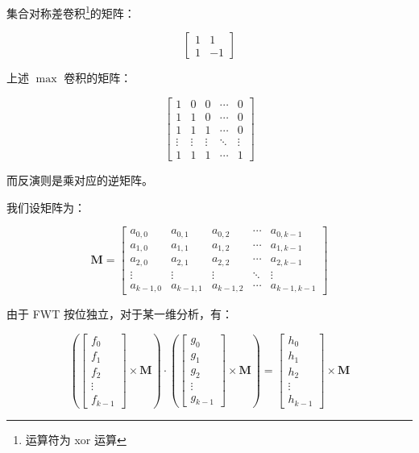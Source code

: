 \documentclass{article}
\begin{document}
集合对称差卷积\footnote{运算符为 xor 运算}的矩阵：

$$\begin{bmatrix} 1 & 1 \\ 1 & -1 \end{bmatrix}$$

上述 $\max$ 卷积的矩阵：

$$\begin{bmatrix} 1& 0 & 0& \cdots & 0\\ 1& 1& 0& \cdots & 0\\ 1& 1 & 1& \cdots & 0\\ \vdots& \vdots& \vdots& \ddots& \vdots\\ 1& 1& 1 & \cdots & 1 \end{bmatrix}$$

而反演则是乘对应的逆矩阵。

我们设矩阵为：

$$\mathbf{M}=\begin{bmatrix} a_{0,0}&  a_{0,1} &  a_{0,2}& \cdots &  a_{0,k-1}\\  a_{1,0}&  a_{1,1}&  a_{1,2}& \cdots &  a_{1,k-1}\\  a_{2,0}&  a_{2,1} &  a_{2,2}& \cdots &  a_{2,k-1}\\ \vdots& \vdots& \vdots& \ddots& \vdots\\  a_{k-1,0}&  a_{k-1,1}&  a_{k-1,2} & \cdots &  a_{k-1,k-1} \end{bmatrix}$$

由于 FWT 按位独立，对于某一维分析，有：

$$\left(\begin{bmatrix}f_0 \\ f_1 \\ f_2 \\ \vdots \\ f_{k-1} \end{bmatrix}\times \mathbf{M} \right) \cdot \left(\begin{bmatrix}g_0 \\ g_1 \\ g_2 \\ \vdots \\ g_{k-1} \end{bmatrix}\times \mathbf{M}\right) = \begin{bmatrix}h_0 \\ h_1 \\ h_2 \\ \vdots \\ h_{k-1} \end{bmatrix}\times \mathbf{M}$$
\end{document}
